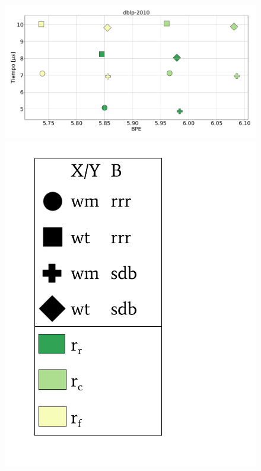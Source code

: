 \begin{figure}
    	\centering
    	\begin{minipage}{1\textwidth}
    			\centering
    			\begin{minipage}{0.8\textwidth}
    				\centering
    				\includegraphics[width=1\linewidth]{img/sdsl/aleatorioBig/dblp-2010.pdf}
    			\end{minipage}
    			\begin{minipage}{0.15\textwidth}
    				\centering
    				\includegraphics[scale=.22, clip, trim=70 0 0 0]{img/sdsl/label.pdf}
    			\end{minipage}
    			

\end{minipage}
\end{figure}
